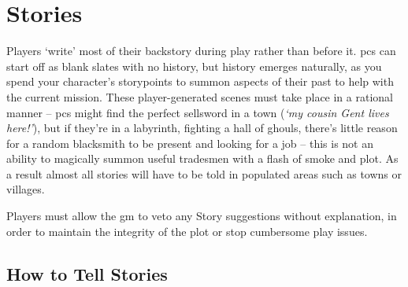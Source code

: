 \chapter[House of Stories]{Stories}
\label{stories}

Players `write' most of their backstory during play rather than before it.
\Glspl{pc} can start off as blank slates with no history, but history emerges naturally, as you spend your character's \glspl{storypoint} to summon aspects of their past to help with the current mission.
These player-generated scenes must take place in a rational manner -- \glspl{pc} might find the perfect sellsword in a town (\textit{`my cousin Gent lives here!'}), but if they're in a labyrinth, fighting a hall of ghouls, there's little reason for a random blacksmith to be present and looking for a job -- this is not an ability to magically summon useful tradesmen with a flash of smoke and plot.
As a result almost all stories will have to be told in populated areas such as towns or \glspl{village}.

Players must allow the \gls{gm} to veto any Story suggestions without explanation, in order to maintain the integrity of the plot or stop cumbersome play issues.

\section{How to Tell Stories}
\label{listOfStories}

